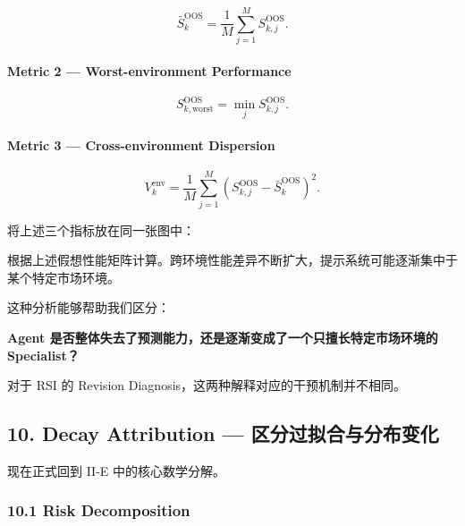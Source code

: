 \[\bar S_k^{\mathrm{OOS}}
=
\frac1M\sum_{j=1}^{M}S_{k,j}^{\mathrm{OOS}}.\]

\hypertarget{part-4-77-0001-metric-2-worst-environment-performance}{%
\paragraph{Metric 2 --- Worst-environment Performance}\label{part-4-77-0001-metric-2-worst-environment-performance}}

\[S_{k,\mathrm{worst}}^{\mathrm{OOS}}
=
\min_jS_{k,j}^{\mathrm{OOS}}.\]

\hypertarget{part-4-77-0001-metric-3-cross-environment-dispersion}{%
\paragraph{Metric 3 --- Cross-environment Dispersion}\label{part-4-77-0001-metric-3-cross-environment-dispersion}}

\[V_k^{\mathrm{env}}
=
\frac1M
\sum_{j=1}^{M}
(S_{k,j}^{\mathrm{OOS}}-\bar S_k^{\mathrm{OOS}})^2.\]

将上述三个指标放在同一张图中：



根据上述假想性能矩阵计算。跨环境性能差异不断扩大，提示系统可能逐渐集中于某个特定市场环境。

这种分析能够帮助我们区分：

\textbf{Agent 是否整体失去了预测能力，还是逐渐变成了一个只擅长特定市场环境的 Specialist？}

对于 RSI 的 Revision Diagnosis，这两种解释对应的干预机制并不相同。

\hypertarget{part-4-77-0001-decay-attribution-ux533aux5206ux8fc7ux62dfux5408ux4e0eux5206ux5e03ux53d8ux5316}{%
\subsection{10. Decay Attribution --- 区分过拟合与分布变化}\label{part-4-77-0001-decay-attribution-ux533aux5206ux8fc7ux62dfux5408ux4e0eux5206ux5e03ux53d8ux5316}}

现在正式回到 II-E 中的核心数学分解。

\hypertarget{part-4-77-0001-risk-decomposition}{%
\subsubsection{10.1 Risk Decomposition}\label{part-4-77-0001-risk-decomposition}}

